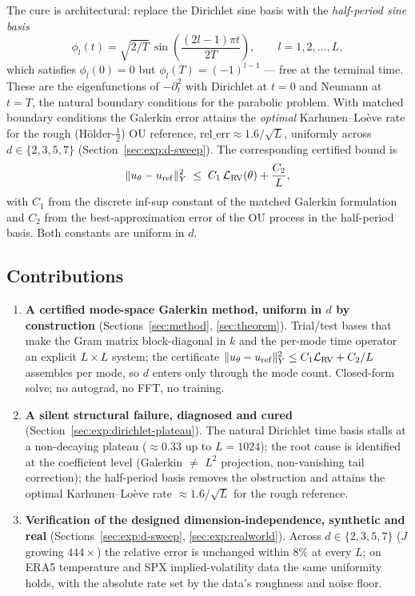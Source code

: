 The cure is architectural: replace the Dirichlet sine basis with the
\emph{half-period sine basis}
\begin{equation}
\phi_l(t) = \sqrt{2/T}\,\sin\!\left(\frac{(2l-1)\pi t}{2T}\right),
\qquad l = 1, 2, \ldots, L,
\label{eq:half-period-basis}
\end{equation}
which satisfies $\phi_l(0) = 0$ but $\phi_l(T) = (-1)^{l-1}$ --- free
at the terminal time. These are the eigenfunctions of $-\partial_t^2$
with Dirichlet at $t = 0$ and Neumann at $t = T$, the natural boundary
conditions for the parabolic problem. With matched boundary conditions
the Galerkin error attains the \emph{optimal} Karhunen--Lo\`eve rate
for the rough (H\"older-$\tfrac12$) OU reference,
$\mathrm{rel\_err} \approx 1.6/\sqrt{L}$, uniformly across
$d \in \{2, 3, 5, 7\}$ (Section~\ref{sec:exp:d-sweep}). The
corresponding certified bound is
\begin{equation}
\|u_\theta - u_{\rm ref}\|_Y^2
\;\le\; C_1\,\mathcal{L}_{\rm RV}(\theta) + \frac{C_2}{L},
\label{eq:main-bound}
\end{equation}
with $C_1$ from the discrete inf-sup constant of the matched Galerkin
formulation and $C_2$ from the best-approximation error of the OU
process in the half-period basis. Both constants are uniform in $d$.

\subsection{Contributions}
\label{sec:intro:contrib}

\begin{enumerate}
\item \textbf{A certified mode-space Galerkin method, uniform in $d$
by construction} (Sections~\ref{sec:method}, \ref{sec:theorem}).
Trial/test bases that make the Gram matrix block-diagonal in $k$ and
the per-mode time operator an explicit $L \times L$ system; the
certificate $\|u_\theta - u_{\rm ref}\|_Y^2 \le
C_1\mathcal{L}_{\rm RV} + C_2/L$ assembles per mode, so $d$ enters
only through the mode count. Closed-form solve; no autograd, no FFT,
no training.

\item \textbf{A silent structural failure, diagnosed and cured}
(Section~\ref{sec:exp:dirichlet-plateau}). The natural Dirichlet
time basis stalls at a non-decaying plateau ($\approx 0.33$ up to
$L = 1024$); the root cause is identified at the coefficient level
(Galerkin $\ne$ $L^2$ projection, non-vanishing tail correction);
the half-period basis removes the obstruction and attains the
optimal Karhunen--Lo\`eve rate $\approx 1.6/\sqrt{L}$ for the rough
reference.

\item \textbf{Verification of the designed dimension-independence,
synthetic and real} (Sections~\ref{sec:exp:d-sweep},
\ref{sec:exp:realworld}). Across $d \in \{2, 3, 5, 7\}$ ($J$ growing
$444\times$) the relative error is unchanged within $8\%$ at every
$L$; on ERA5 temperature and SPX implied-volatility data the same
uniformity holds, with the absolute rate set by the data's roughness
and noise floor.
\end{enumerate}

